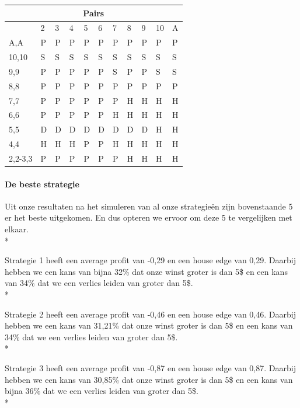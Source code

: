 \documentclass[conference]{IEEEtran}
\begin{document}
\begin{table}[ht]
\begin{tabular}{|l|l|l|l|l|l|l|l|l|l|l|}
\multicolumn{11}{|c|}{\textbf{Pairs}}                                 \\ \hline
                             & 2 & 3 & 4 & 5 & 6 & 7 & 8 & 9 & 10 & A \\ \hline
A,A                          & P & P & P & P & P & P & P & P & P & P  \\ \hline
10,10                        & S & S & S & S & S & S & S & S & S & S  \\ \hline
9,9                          & P & P & P & P & P & S & P & P & S & S  \\ \hline
8,8                          & P & P & P & P & P & P & P & P & P & P  \\ \hline
7,7                          & P & P & P & P & P & P & H & H & H & H  \\ \hline
6,6                          & P & P & P & P & P & H & H & H & H & H  \\ \hline
5,5                          & D & D & D & D & D & D & D & D & H & H  \\ \hline
4,4                          & H & H & H & P & P & H & H & H & H & H  \\ \hline
2,2-3,3                      & P & P & P & P & P & P & H & H & H & H  \\ \hline
\end{tabular}
\end{table}

\paragraph{De beste strategie}

Uit onze resultaten na het simuleren van al onze strategie\"en zijn bovenstaande 5 er het beste uitgekomen. En dus opteren we ervoor om deze 5 te vergelijken met elkaar. \\*

Strategie 1 heeft een average profit van -0,29 en een house edge van 0,29. Daarbij hebben we een kans van bijna 32\% dat onze winst groter is dan 5\$ en een kans van 34\% dat we een verlies leiden van groter dan 5\$. \\*

Strategie 2 heeft een average profit van -0,46 en een house edge van 0,46. Daarbij hebben we een kans van 31,21\% dat onze winst groter is dan 5\$ en een kans van 34\% dat we een verlies leiden van groter dan 5\$.\\*

Strategie 3 heeft een average profit van -0,87 en een house edge van 0,87. Daarbij hebben we een kans van 30,85\% dat onze winst groter is dan 5\$ en een kans van bijna 36\% dat we een verlies leiden van groter dan 5\$.\\*
\end{document}

